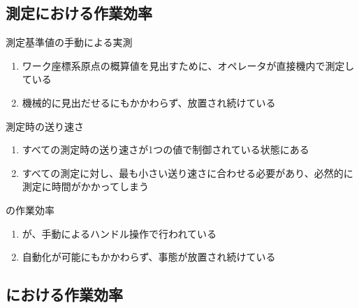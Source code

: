 \subsection{測定における作業効率}

\begin{Issues}{測定基準値の手動による実測}
\begin{enumerate}[label=\sarrow]
\item[{\sarrow[red]}]ワーク座標系原点の概算値を見出すために、オペレータが直接機内で測定している
\item[{\sarrow[red]}]機械的に見出だせるにもかかわらず、放置され続けている
\end{enumerate}
\end{Issues}

\begin{Issues}{測定時の送り速さ}
\begin{enumerate}[label=\sarrow]
\item[{\sarrow[red]}]すべての測定時の送り速さが1つの値で制御されている状態にある
\item[{\sarrow[red]}]すべての測定に対し、最も小さい送り速さに合わせる必要があり、必然的に測定に時間がかかってしまう
\end{enumerate}
\end{Issues}

\begin{Issues}{\CenterlineEndFaceDifMeasurement の作業効率}
\begin{enumerate}[label=\sarrow]
\item[{\sarrow[red]}]\CenterlineEndFaceDifMeasurement が、手動によるハンドル操作で行われている
\item[{\sarrow[red]}]自動化が可能にもかかわらず、事態が放置され続けている
\end{enumerate}
\end{Issues}


\clearpage
\subsection{\EndFacecutMilling における作業効率}

